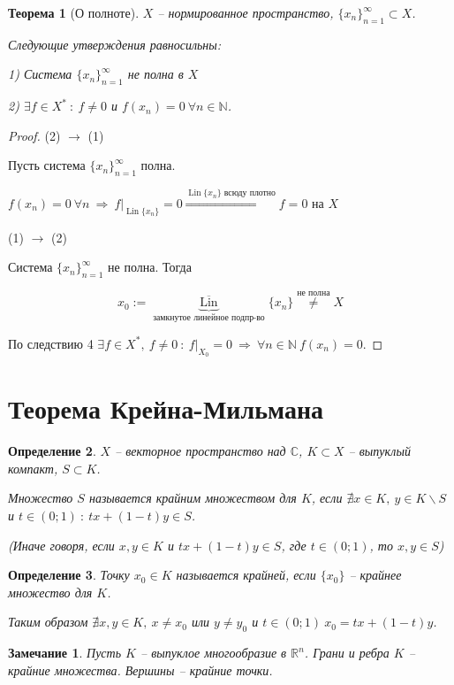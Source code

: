 \documentclass[12pt,a4paper]{report}
\DeclareMathOperator*{\Lin}{Lin}
\newcommand{\then}{\ \Longrightarrow \ }
\renewcommand{\C}{\mathbb{C}}
\newcommand{\R}{\mathbb{R}}
\newcommand{\N}{\mathbb{N}}
\newtheorem{thm}{Теорема}[section]
\newtheorem{dfn}[thm]{Определение}
\newtheorem*{note}{Замечание}
\begin{document}
\begin{thm}[О полноте]
$X$ -- нормированное пространство, $\{ x_n \}_{n=1}^\infty \subset X$.

Следующие утверждения равносильны:

1) Система $\{ x_n \}_{n=1}^\infty$  не полна в $X$

2) $\exists f \in X^* \ : \ f \neq 0$ и $f(x_n) = 0 \ \forall n \in \N$.
\end{thm}

\begin{proof}
(2) $\to$ (1)

Пусть система $\{ x_n \}_{n=1}^\infty$ полна.

$f(x_n) = 0 \ \forall n \then f\big|_{\Lin \{ x_n \}} = 0 \overset{\Lin \{ x_n \} \text{ всюду плотно}}{\then} f=0$ на $X$

(1) $\to$ (2)

Система $\{ x_n \}_{n=1}^\infty$ не полна. Тогда

$$x_0 := \underbrace{\overline{\Lin}}_{\text{замкнутое линейное подпр-во}} \{ x_n \} \overset{\text{не полна}}{\neq} X$$

По следствию 4 $\exists f \in X^*, \ f \neq 0 \ : \ f\big|_{X_0}  = 0 \then \forall n \in \N \ f(x_n) = 0$.
\end{proof}

\section{Теорема Крейна-Мильмана}
\begin{dfn}
$X$ -- векторное пространство над $\C$, $K \subset X$ -- выпуклый компакт, $S \subset K$.

Множество $S$ называется крайним множеством для $K$, если $\nexists x \in K, \ y \in K \smallsetminus S$ и $t \in (0;1) \ : \ tx + (1-t)y \in S$.

(Иначе говоря, если $x,y \in K$ и $tx + (1-t) y \in S$, где $t \in (0;1)$, то $x,y \in S$)
\end{dfn}

\begin{dfn}
Точку $x_0 \in K$ называется крайней, если $\{ x_0 \}$ -- крайнее множество для $K$.

Таким образом $\nexists x,y \in K, \ x \neq x_0$ или $y \neq y_0$ и $t \in (0;1)  \ x_0 = tx + (1-t)y$.
\end{dfn}

\begin{note}
Пусть $K$ -- выпуклое многообразие в $\R^n$. Грани и ребра $K$ -- крайние множества. Вершины -- крайние точки.
\end{note}
\end{document}
